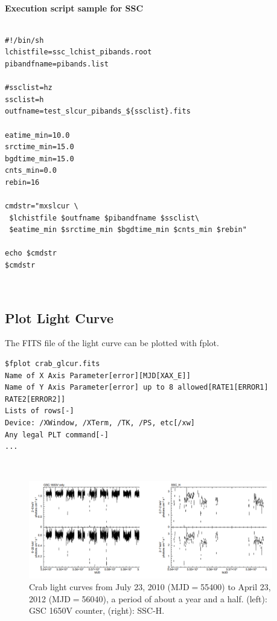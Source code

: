 \documentclass[10pt]{report}
\renewcommand{\_}{\textscale{.5}{\textbf{\textunderscore}}}
\begin{document}
\

\noindent\textbf{Execution script sample for SSC} \\

\begin{lstlisting}[frame=single]

#!/bin/sh
lchistfile=ssc_lchist_pibands.root
pibandfname=pibands.list

#ssclist=hz
ssclist=h
outfname=test_slcur_pibands_${ssclist}.fits

eatime_min=10.0
srctime_min=15.0
bgdtime_min=15.0
cnts_min=0.0
rebin=16

cmdstr="mxslcur \
 $lchistfile $outfname $pibandfname $ssclist\
 $eatime_min $srctime_min $bgdtime_min $cnts_min $rebin"
 
echo $cmdstr
$cmdstr

\end{lstlisting}

\

\subsection{Plot Light Curve}\label{subsec:4.3.5}

The FITS file of the light curve can be plotted with fplot. \\

\begin{lstlisting}
$fplot crab_glcur.fits
Name of X Axis Parameter[error][MJD[XAX_E]]
Name of Y Axis Parameter[error] up to 8 allowed[RATE1[ERROR1] RATE2[ERROR2]]
Lists of rows[-]
Device: /XWindow, /XTerm, /TK, /PS, etc[/xw]
Any legal PLT command[-]
...
\end{lstlisting}

\

\begin{figure}[hbtp!]
  \centering
  \includegraphics[width=0.95\textwidth]{4_3.png}
  \caption{Crab light curves from July 23, 2010 (MJD$=$55400) to April 23, 2012 (MJD$=$56040), a period of about a year and a half. (left): GSC 1650V counter, (right): SSC-H.}
  \label{fig:3}
\end{figure}
\end{document}
